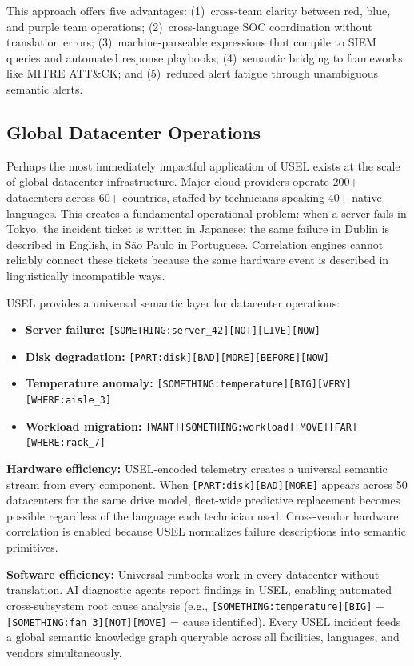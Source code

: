 \documentclass[11pt,a4paper]{article}
\begin{document}
This approach offers five advantages: (1)~cross-team clarity between red, blue, and purple team operations; (2)~cross-language SOC coordination without translation errors; (3)~machine-parseable expressions that compile to SIEM queries and automated response playbooks; (4)~semantic bridging to frameworks like MITRE ATT\&CK; and (5)~reduced alert fatigue through unambiguous semantic alerts.

\subsection{Global Datacenter Operations}
\label{sec:datacenter}

Perhaps the most immediately impactful application of USEL exists at the scale of global datacenter infrastructure. Major cloud providers operate 200+ datacenters across 60+ countries, staffed by technicians speaking 40+ native languages. This creates a fundamental operational problem: when a server fails in Tokyo, the incident ticket is written in Japanese; the same failure in Dublin is described in English, in S\~ao Paulo in Portuguese. Correlation engines cannot reliably connect these tickets because the same hardware event is described in linguistically incompatible ways.

USEL provides a universal semantic layer for datacenter operations:

\begin{itemize}
  \item \textbf{Server failure:} \texttt{[SOMETHING:server\_42][NOT][LIVE][NOW]}
  \item \textbf{Disk degradation:} \texttt{[PART:disk][BAD][MORE][BEFORE][NOW]}
  \item \textbf{Temperature anomaly:} \texttt{[SOMETHING:temperature][BIG][VERY][WHERE:aisle\_3]}
  \item \textbf{Workload migration:} \texttt{[WANT][SOMETHING:workload][MOVE][FAR][WHERE:rack\_7]}
\end{itemize}

\textbf{Hardware efficiency:} USEL-encoded telemetry creates a universal semantic stream from every component. When \texttt{[PART:disk][BAD][MORE]} appears across 50 datacenters for the same drive model, fleet-wide predictive replacement becomes possible regardless of the language each technician used. Cross-vendor hardware correlation is enabled because USEL normalizes failure descriptions into semantic primitives.

\textbf{Software efficiency:} Universal runbooks work in every datacenter without translation. AI diagnostic agents report findings in USEL, enabling automated cross-subsystem root cause analysis (e.g., \texttt{[SOMETHING:temperature][BIG]} + \texttt{[SOMETHING:fan\_3][NOT][MOVE]} = cause identified). Every USEL incident feeds a global semantic knowledge graph queryable across all facilities, languages, and vendors simultaneously.
\end{document}
